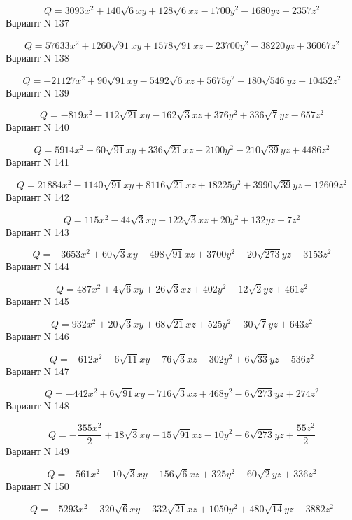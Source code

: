 \documentclass[11pt]{report}
\begin{document}
$$Q = 3093 x^{2} + 140 \sqrt{6} x y + 128 \sqrt{6} x z - 1700 y^{2} - 1680 y z + 2357 z^{2}$$Вариант N 137

$$Q = 57633 x^{2} + 1260 \sqrt{91} x y + 1578 \sqrt{91} x z - 23700 y^{2} - 38220 y z + 36067 z^{2}$$Вариант N 138

$$Q = - 21127 x^{2} + 90 \sqrt{91} x y - 5492 \sqrt{6} x z + 5675 y^{2} - 180 \sqrt{546} y z + 10452 z^{2}$$Вариант N 139

$$Q = - 819 x^{2} - 112 \sqrt{21} x y - 162 \sqrt{3} x z + 376 y^{2} + 336 \sqrt{7} y z - 657 z^{2}$$Вариант N 140

$$Q = 5914 x^{2} + 60 \sqrt{91} x y + 336 \sqrt{21} x z + 2100 y^{2} - 210 \sqrt{39} y z + 4486 z^{2}$$Вариант N 141

$$Q = 21884 x^{2} - 1140 \sqrt{91} x y + 8116 \sqrt{21} x z + 18225 y^{2} + 3990 \sqrt{39} y z - 12609 z^{2}$$Вариант N 142

$$Q = 115 x^{2} - 44 \sqrt{3} x y + 122 \sqrt{3} x z + 20 y^{2} + 132 y z - 7 z^{2}$$Вариант N 143

$$Q = - 3653 x^{2} + 60 \sqrt{3} x y - 498 \sqrt{91} x z + 3700 y^{2} - 20 \sqrt{273} y z + 3153 z^{2}$$Вариант N 144

$$Q = 487 x^{2} + 4 \sqrt{6} x y + 26 \sqrt{3} x z + 402 y^{2} - 12 \sqrt{2} y z + 461 z^{2}$$Вариант N 145

$$Q = 932 x^{2} + 20 \sqrt{3} x y + 68 \sqrt{21} x z + 525 y^{2} - 30 \sqrt{7} y z + 643 z^{2}$$Вариант N 146

$$Q = - 612 x^{2} - 6 \sqrt{11} x y - 76 \sqrt{3} x z - 302 y^{2} + 6 \sqrt{33} y z - 536 z^{2}$$Вариант N 147

$$Q = - 442 x^{2} + 6 \sqrt{91} x y - 716 \sqrt{3} x z + 468 y^{2} - 6 \sqrt{273} y z + 274 z^{2}$$Вариант N 148

$$Q = - \frac{355 x^{2}}{2} + 18 \sqrt{3} x y - 15 \sqrt{91} x z - 10 y^{2} - 6 \sqrt{273} y z + \frac{55 z^{2}}{2}$$Вариант N 149

$$Q = - 561 x^{2} + 10 \sqrt{3} x y - 156 \sqrt{6} x z + 325 y^{2} - 60 \sqrt{2} y z + 336 z^{2}$$Вариант N 150

$$Q = - 5293 x^{2} - 320 \sqrt{6} x y - 332 \sqrt{21} x z + 1050 y^{2} + 480 \sqrt{14} y z - 3882 z^{2}$$
\end{document}
